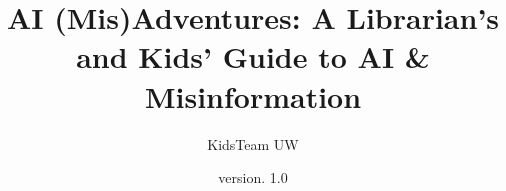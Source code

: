 \documentclass{article}
\title{AI (Mis)Adventures: A Librarian's and Kids' Guide to AI & Misinformation}
\author{KidsTeam UW}
\date{version. 1.0}
\begin{document}
\begin{titlepage}
    \begin{center}
    
        \vspace*{1cm}
            
        \Huge
            
        \vspace{0.5cm}
        \LARGE
            
        \vspace{1 cm}
            
            
        \vfill
            
        \vspace{0.8cm}
            
            
        \Large
            
    \end{center}
\end{titlepage}
\end{document}
